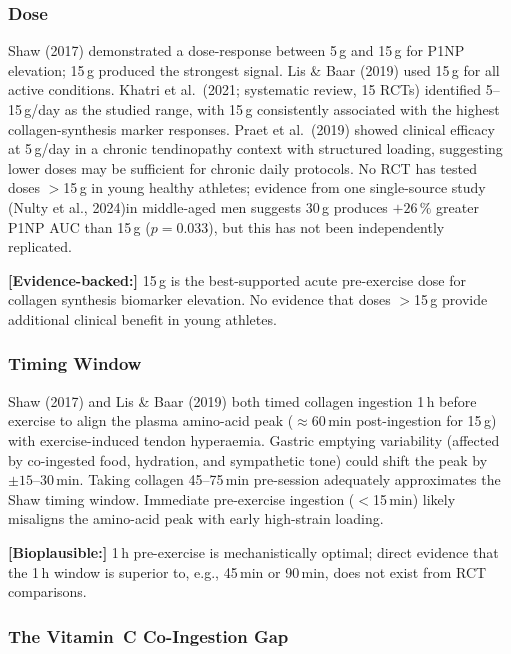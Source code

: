 \subsubsection{Dose}

Shaw (2017) demonstrated a dose-response between 5\,g and 15\,g for P1NP elevation; 15\,g produced the strongest signal. Lis \& Baar (2019) used 15\,g for all active conditions. Khatri et al.\ (2021; systematic review, 15 RCTs) identified 5--15\,g/day as the studied range, with 15\,g consistently associated with the highest collagen-synthesis marker responses. Praet et al.\ (2019) showed clinical efficacy at 5\,g/day in a chronic tendinopathy context with structured loading, suggesting lower doses may be sufficient for chronic daily protocols. No RCT has tested doses $>$15\,g in young healthy athletes; evidence from one single-source study (Nulty et al., 2024)\singlesource in middle-aged men suggests 30\,g produces $+26\,\%$ greater P1NP AUC than 15\,g ($p{=}0.033$), but this has not been independently replicated.

\textbf{[Evidence-backed:]} 15\,g is the best-supported acute pre-exercise dose for collagen synthesis biomarker elevation. No evidence that doses $>$15\,g provide additional clinical benefit in young athletes.

\subsubsection{Timing Window}

Shaw (2017) and Lis \& Baar (2019) both timed collagen ingestion 1\,h before exercise to align the plasma amino-acid peak (${\approx}60$\,min post-ingestion for 15\,g) with exercise-induced tendon hyperaemia. Gastric emptying variability (affected by co-ingested food, hydration, and sympathetic tone) could shift the peak by ${\pm}15$--30\,min. Taking collagen 45--75\,min pre-session adequately approximates the Shaw timing window. Immediate pre-exercise ingestion ($<$15\,min) likely misaligns the amino-acid peak with early high-strain loading.

\textbf{[Bioplausible:]} 1\,h pre-exercise is mechanistically optimal; direct evidence that the 1\,h window is superior to, e.g., 45\,min or 90\,min, does not exist from RCT comparisons.

\subsubsection{The Vitamin~C Co-Ingestion Gap}
\label{subsubsec:vitc}

